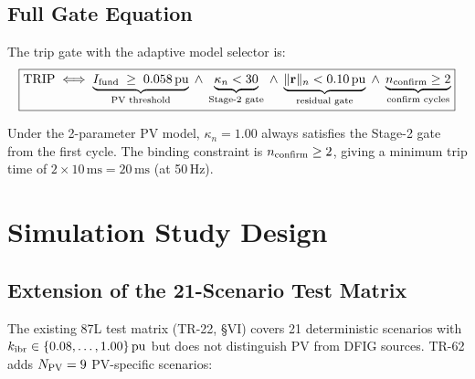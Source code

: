 \documentclass[11pt, a4paper]{article}
\newcommand{\pu}{\,\text{pu}}
\newcommand{\ms}{\,\text{ms}}
\newcommand{\kn}{\kappa_n}
\newcommand{\kIBR}{k_{\rm ibr}}
\begin{document}
\subsection{Full Gate Equation}

The trip gate with the adaptive model selector is:
\begin{equation}
  \boxed{
    \text{TRIP} \;\Longleftrightarrow\;
    \underbrace{I_{\rm fund} \;\geq\; 0.058\pu}_{\text{PV threshold}}
    \;\wedge\;
    \underbrace{\kn < 30}_{\text{Stage-2 gate}}
    \;\wedge\;
    \underbrace{\|\mathbf{r}\|_n < 0.10\pu}_{\text{residual gate}}
    \;\wedge\;
    \underbrace{n_{\rm confirm} \geq 2}_{\text{confirm cycles}}
  }
  \label{eq:gate}
\end{equation}

Under the 2-parameter PV model, $\kn = 1.00$ always satisfies the Stage-2
gate from the first cycle.  The binding constraint is $n_{\rm confirm} \geq 2$,
giving a minimum trip time of $2 \times 10\ms = 20\ms$ (at 50\,Hz).

\section{Simulation Study Design}
\label{sec:simulation}

\subsection{Extension of the 21-Scenario Test Matrix}

The existing 87L test matrix (TR-22, §VI) covers 21 deterministic scenarios
with $\kIBR \in \{0.08, \ldots, 1.00\}\pu$ but does not distinguish PV from
DFIG sources.  TR-62 adds $N_{\rm PV} = 9$ PV-specific scenarios:
\end{document}
